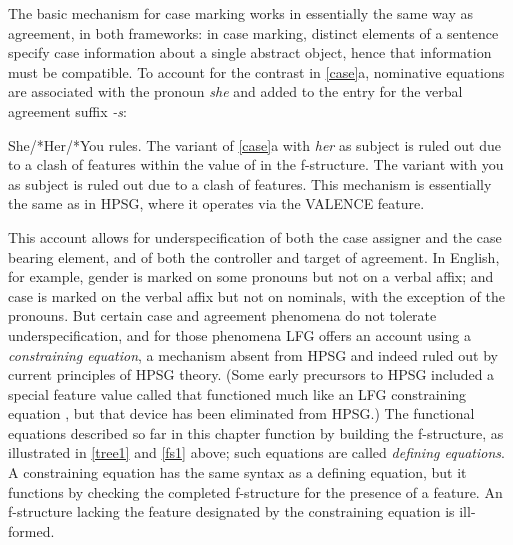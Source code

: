 \documentclass[output=paper
                ,modfonts
                ,nonflat
	        ,collection
	        ,collectionchapter
	        ,collectiontoclongg
 	        ,biblatex
                ,babelshorthands
                ,newtxmath
                ,draftmode
                ,colorlinks, citecolor=brown
]{./langsci/langscibook}
\begin{document}
The basic mechanism for case marking works in essentially the same way as agreement, in both frameworks: in case marking, distinct elements of a sentence specify case information about a single abstract object, hence that information must be compatible.   To account for the contrast in \ref{case}a, nominative  equations are associated with the pronoun \textit{she} and added to the entry for the verbal agreement suffix \textit{-s}:

\eal 
 \label{case}
\ex She/*Her/*You rules.
 \zl
The variant of \ref{case}a with \textit{her} as subject is ruled out due to a clash of  features within the value of \subj{} in the f-structure.  The variant with you as subject is ruled out due to a clash of  features.  This mechanism is essentially the same as in HPSG, where it operates via the VALENCE feature.  

This account allows for underspecification of both the case assigner and the case bearing element, and of both the controller and target of agreement.   In  English, for example, gender is marked on some pronouns but not on a verbal affix; and case is marked on the verbal affix but not on  nominals, with the exception of the pronouns.  But certain case and agreement phenomena do not tolerate underspecification, and for those phenomena LFG offers an account using a \textit{constraining equation}, a mechanism absent from HPSG and indeed ruled out by current principles of HPSG theory.  (Some early precursors to HPSG included a special feature value called  that functioned much like an LFG constraining equation \citep[pp. 36-7]{Shieber86a}, but that device has been eliminated from HPSG.)  The functional equations described so far in this chapter function by building the f-structure, as illustrated in \ref{tree1} and \ref{fs1} above; such equations are called \textit{defining equations}.  A constraining equation has the same syntax as a defining equation, but it functions by checking the completed f-structure for the presence of a feature.  An f-structure lacking the feature designated by the constraining equation is ill-formed.  
\end{document}
